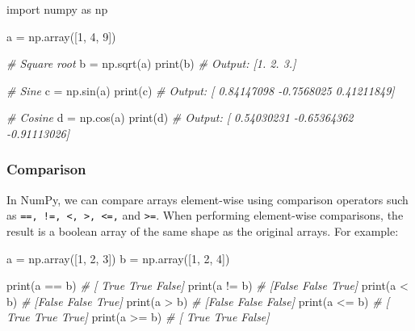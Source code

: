 \documentclass[11pt]{article}
\newenvironment{Shaded}{}{}
\newcommand{\DecValTok}[1]{\textcolor[rgb]{0.25,0.63,0.44}{{#1}}}
\newcommand{\CommentTok}[1]{\textcolor[rgb]{0.38,0.63,0.69}{\textit{{#1}}}}
\newcommand{\NormalTok}[1]{{#1}}
\newcommand{\ImportTok}[1]{{#1}}
\newcommand{\OperatorTok}[1]{\textcolor[rgb]{0.40,0.40,0.40}{{#1}}}
\newcommand{\BuiltInTok}[1]{{#1}}
\begin{document}
\begin{Shaded}
\begin{Highlighting}[]
\ImportTok{import}\NormalTok{ numpy }\ImportTok{as}\NormalTok{ np}

\NormalTok{a }\OperatorTok{=}\NormalTok{ np.array([}\DecValTok{1}\NormalTok{, }\DecValTok{4}\NormalTok{, }\DecValTok{9}\NormalTok{])}

\CommentTok{\# Square root}
\NormalTok{b }\OperatorTok{=}\NormalTok{ np.sqrt(a)}
\BuiltInTok{print}\NormalTok{(b)  }\CommentTok{\# Output: [1. 2. 3.]}

\CommentTok{\# Sine}
\NormalTok{c }\OperatorTok{=}\NormalTok{ np.sin(a)}
\BuiltInTok{print}\NormalTok{(c)  }\CommentTok{\# Output: [ 0.84147098 {-}0.7568025   0.41211849]}

\CommentTok{\# Cosine}
\NormalTok{d }\OperatorTok{=}\NormalTok{ np.cos(a)}
\BuiltInTok{print}\NormalTok{(d)  }\CommentTok{\# Output: [ 0.54030231 {-}0.65364362 {-}0.91113026]}
\end{Highlighting}
\end{Shaded}

\hypertarget{comparison}{%
\subsubsection{Comparison}\label{comparison}}

In NumPy, we can compare arrays element-wise using comparison operators
such as \texttt{==,\ !=,\ \textless{},\ \textgreater{},\ \textless{}=,}
and \texttt{\textgreater{}=}. When performing element-wise comparisons,
the result is a boolean array of the same shape as the original arrays.
For example:

\begin{Shaded}
\begin{Highlighting}[]
\NormalTok{a }\OperatorTok{=}\NormalTok{ np.array([}\DecValTok{1}\NormalTok{, }\DecValTok{2}\NormalTok{, }\DecValTok{3}\NormalTok{])}
\NormalTok{b }\OperatorTok{=}\NormalTok{ np.array([}\DecValTok{1}\NormalTok{, }\DecValTok{2}\NormalTok{, }\DecValTok{4}\NormalTok{])}

\BuiltInTok{print}\NormalTok{(a }\OperatorTok{==}\NormalTok{ b)  }\CommentTok{\# [ True  True False]}
\BuiltInTok{print}\NormalTok{(a }\OperatorTok{!=}\NormalTok{ b)  }\CommentTok{\# [False False  True]}
\BuiltInTok{print}\NormalTok{(a }\OperatorTok{\textless{}}\NormalTok{ b)   }\CommentTok{\# [False False  True]}
\BuiltInTok{print}\NormalTok{(a }\OperatorTok{\textgreater{}}\NormalTok{ b)   }\CommentTok{\# [False False False]}
\BuiltInTok{print}\NormalTok{(a }\OperatorTok{\textless{}=}\NormalTok{ b)  }\CommentTok{\# [ True  True  True]}
\BuiltInTok{print}\NormalTok{(a }\OperatorTok{\textgreater{}=}\NormalTok{ b)  }\CommentTok{\# [ True  True False]}
\end{Highlighting}
\end{Shaded}
\end{document}
